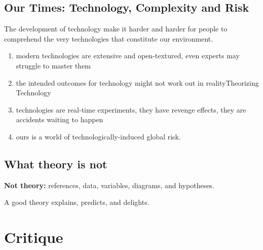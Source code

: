 \documentclass[18pt]{article}
\begin{document}
\subsection{Our Times: Technology, Complexity and Risk}
The development of technology make it harder and harder for people to comprehend the very technologies
that constitute our environment.
\begin{enumerate}
    \item modern technologies are extensive and open-textured, even experts may struggle to master them
    \item the intended outcomes for technology might not work out in realityTheorizing Technology
    \item technologies are real-time experiments, they have revenge effects, they are accidents waiting to happen
    \item ours is a world of technologically-induced global risk.
\end{enumerate}

\subsection{What theory is not}
\textbf{Not theory:} references, data, variables, diagrams, and hypotheses.

A good theory explains, predicts, and delights.

\section{Critique}





\end{document}

